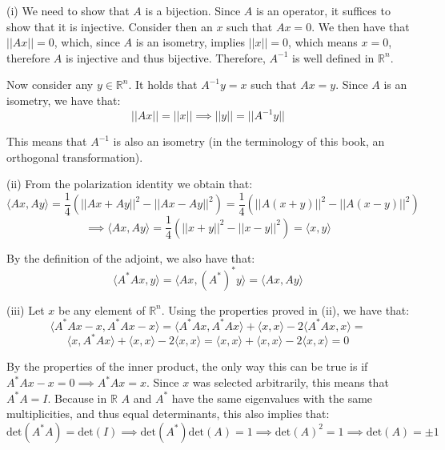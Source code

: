 \begin{solution}

    (i) We need to show that $A$ is a bijection. Since $A$ is an operator, it suffices to show that it is injective. Consider then an $x$ such that $Ax = 0$. We then have that $\lvert \lvert Ax \rvert \rvert = 0$, which, since $A$ is an isometry, implies $\lvert \lvert x \rvert \rvert = 0$, which means $x = 0$, therefore $A$ is injective and thus bijective. Therefore, $A^{-1}$ is well defined in $\mathbb{R}^n$.

    Now consider any $y \in \mathbb{R}^n$. It holds that $A^{-1}y = x$ such that $Ax = y$. Since $A$ is an isometry, we have that:
    $$\lvert \lvert Ax \rvert \rvert = \lvert \lvert x \rvert \rvert \implies \lvert \lvert y \rvert \rvert = \lvert \lvert A^{-1}y \rvert \rvert$$

    This means that $A^{-1}$ is also an isometry (in the terminology of this book, an orthogonal transformation).

    (ii) From the polarization identity we obtain that:
    $$\langle Ax, Ay \rangle = \frac{1}{4}(\lvert \lvert Ax + Ay \rvert \rvert^2 - \lvert \lvert Ax - Ay \rvert \rvert^2) = \frac{1}{4}(\lvert \lvert A(x+y) \rvert \rvert^2 - \lvert \lvert A(x-y) \rvert \rvert^2)$$
    $$\implies \langle Ax, Ay \rangle = \frac{1}{4}(\lvert \lvert x + y \rvert \rvert^2 - \lvert \lvert x - y \rvert \rvert^2) = \langle x, y \rangle$$

    By the definition of the adjoint, we also have that:
    $$\langle A^*Ax, y \rangle = \langle Ax, (A^*)^*y \rangle = \langle Ax, Ay \rangle$$

    (iii) Let $x$ be any element of $\mathbb{R}^n$. Using the properties proved in (ii), we have that:
    $$\langle A^*Ax - x, A^*Ax - x \rangle = \langle A^*Ax, A^*Ax \rangle + \langle x, x \rangle - 2\langle A^*Ax, x \rangle = $$
    $$\langle x, A^*Ax \rangle + \langle x, x \rangle - 2\langle x, x \rangle = \langle x, x \rangle + \langle x, x \rangle - 2 \langle x, x \rangle = 0$$

    By the properties of the inner product, the only way this can be true is if $A^*Ax - x = 0 \implies A^*Ax = x$. Since $x$ was selected arbitrarily, this means that $A^*A = I$. Because in $\mathbb{R}$ $A$ and $A^*$ have the same eigenvalues with the same multiplicities, and thus equal determinants, this also implies that:
    $$\text{det}(A^*A) = \text{det}(I) \implies \text{det}(A^*)\text{det}(A) = 1 \implies \text{det}(A)^2 = 1 \implies \text{det}(A) = \pm 1$$
    

\end{solution}

